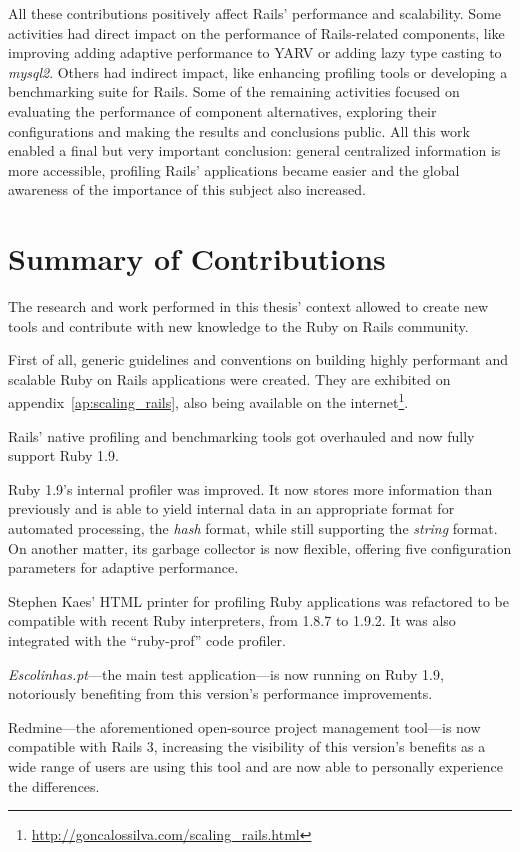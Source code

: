 All these contributions positively affect Rails' performance and scalability. Some activities had direct impact on the performance of Rails-related components, like improving adding adaptive performance to YARV or adding lazy type casting to \textit{mysql2}. Others had indirect impact, like enhancing profiling tools or developing a benchmarking suite for Rails. Some of the remaining activities focused on evaluating the performance of component alternatives, exploring their configurations and making the results and conclusions public. All this work enabled a final but very important conclusion: general centralized information is more accessible, profiling Rails' applications became easier and the global awareness of the importance of this subject also increased. 

\section{Summary of Contributions}
The research and work performed in this thesis' context allowed to create new tools and contribute with new knowledge to the Ruby on Rails community.

First of all, generic guidelines and conventions on building highly performant and scalable Ruby on Rails applications were created. They are exhibited on appendix~\ref{ap:scaling_rails}, also being available on the internet\footnote{\url{http://goncalossilva.com/scaling_rails.html}}.

Rails' native profiling and benchmarking tools got overhauled and now fully support Ruby 1.9.

Ruby 1.9's internal profiler was improved. It now stores more information than previously and is able to yield internal data in an appropriate format for automated processing, the \textit{hash} format, while still supporting the \textit{string} format. On another matter, its garbage collector is now flexible, offering five configuration parameters for adaptive performance.

Stephen Kaes' HTML printer for profiling Ruby applications was refactored to be compatible with recent Ruby interpreters, from 1.8.7 to 1.9.2. It was also integrated with the ``ruby-prof'' code profiler.

\textit{Escolinhas.pt}---the main test application---is now running on Ruby 1.9, notoriously benefiting from this version's performance improvements.

Redmine---the aforementioned open-source project management tool---is now compatible with Rails 3, increasing the visibility of this version's benefits as a wide range of users are using this tool and are now able to personally experience the differences.

